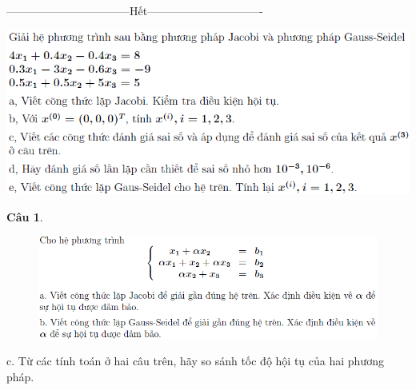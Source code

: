 \documentclass[11pt]{article}
\newtheorem{bt}{Câu}
\begin{document}
\centerline{———————————Hết——————————-}


\begin{center}
	\includegraphics[scale = 0.7]{4}	
\end{center}

\begin{bt}
\end{bt}
\begin{figure}[H]
	\includegraphics[scale = 0.7]{5}
\end{figure}
c. Từ các tính toán ở hai câu trên, hãy so sánh tốc độ hội tụ của hai phương pháp.
\end{document}

